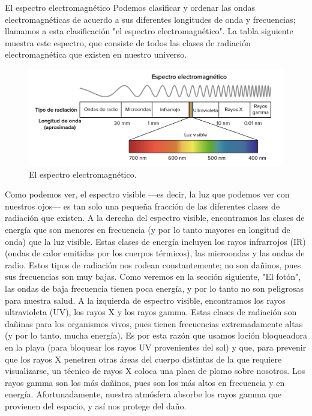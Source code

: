 \begin{sectionbox}{El espectro electromagnético}
    Podemos clasificar y ordenar las ondas electromagnéticas de acuerdo a sus diferentes longitudes de onda y frecuencias; llamamos a esta clasificación "el espectro electromagnético". La tabla siguiente muestra este espectro, que consiste de todos las clases de radiación electromagnética que existen en nuestro universo.

    \begin{figure}[H]
        \centering
        \includegraphics[width=0.9\linewidth]{../images/01f944ab4471010d09766560f4d1c6da4846d97d}
        \caption{El espectro electromagnético.}
        \label{fig:01f944ab4471010d09766560f4d1c6da4846d97d}
    \end{figure}

    Como podemos ver, el espectro visible —es decir, la luz que podemos ver con nuestros ojos— es tan solo una pequeña fracción de las diferentes clases de radiación que existen. A la derecha del espectro visible, encontramos las clases de energía que son menores en frecuencia (y por lo tanto mayores en longitud de onda) que la luz visible. Estas clases de energía incluyen los rayos infrarrojos (IR) (ondas de calor emitidas por los cuerpos térmicos), las microondas y las ondas de radio. Estos tipos de radiación nos rodean constantemente; no son dañinos, pues sus frecuencias son muy bajas. Como veremos en la sección siguiente, "El fotón", las ondas de baja frecuencia tienen poca energía, y por lo tanto no son peligrosas para nuestra salud.
    A la izquierda de espectro visible, encontramos los rayos ultravioleta (UV), los rayos X y los rayos gamma. Estas clases de radiación son dañinas para los organismos vivos, pues tienen frecuencias extremadamente altas (y por lo tanto, mucha energía). Es por esta razón que usamos loción bloqueadora en la playa (para bloquear los rayos UV provenientes del sol) y que, para prevenir que los rayos X penetren otras áreas del cuerpo distintas de la que requiere visualizarse, un técnico de rayos X coloca una placa de plomo sobre nosotros. Los rayos gamma son los más dañinos, pues son los más altos en frecuencia y en energía. Afortunadamente, nuestra atmósfera absorbe los rayos gamma que provienen del espacio, y así nos protege del daño.
\end{sectionbox}